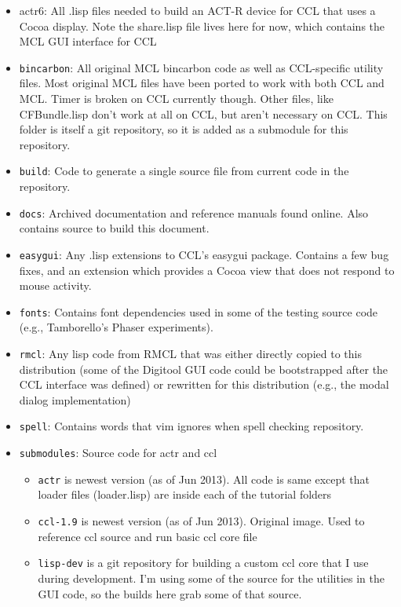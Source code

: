 \documentclass[12pt]{article} %
\newcommand{\filesys}[1]{\texttt{#1}}
\begin{document}
\begin{itemize}
  \item actr6: All .lisp files needed to build an ACT-R device for CCL that uses a Cocoa display. Note the share.lisp file lives here for now, which contains the MCL GUI interface for CCL
  \item \filesys{bincarbon}:
    All original MCL bincarbon code as well as CCL-specific utility files. 
    Most original MCL files have been ported to work with both CCL and MCL.
    Timer is broken on CCL currently though.
    Other files, like CFBundle.lisp don't work at all on CCL, but aren't necessary on CCL.
    This folder is itself a git repository, so it is added as a submodule for this repository.
  \item \filesys{build}: Code to generate a single source file from current code in the repository.
  \item \filesys{docs}:
    Archived documentation and reference manuals found online.
    Also contains source to build this document.
  \item \filesys{easygui}:
    Any .lisp extensions to CCL's easygui package.
    Contains a few bug fixes, and an extension which provides a Cocoa view that does not respond to mouse activity.
  \item \filesys{fonts}: Contains font dependencies used in some of the testing source code (e.g., Tamborello's Phaser experiments).
  \item \filesys{rmcl}:
    Any lisp code from RMCL that was either directly copied to this distribution (some of the Digitool GUI code could be bootstrapped after the CCL interface was defined)
    or rewritten for this distribution (e.g., the modal dialog implementation)
  \item \filesys{spell}: Contains words that vim ignores when spell checking repository.
  \item \filesys{submodules}: Source code for actr and ccl
    \begin{itemize}
      \item \filesys{actr} is newest version (as of Jun 2013). All code is same except that loader files (loader.lisp) are inside each of the tutorial folders
      \item \filesys{ccl-1.9} is newest version (as of Jun 2013). Original image. Used to reference ccl source and run basic ccl core file
      \item \filesys{lisp-dev} is a git repository for building a custom ccl core that I use during development.
	I'm using some of the source for the utilities in the GUI code, so the builds here grab some of that source.

\end{itemize}
\end{itemize}
\end{document}
